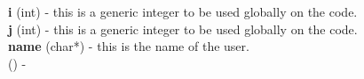 
{\bf i} (int) - this is a generic integer to be used globally on the code. \\

{\bf j} (int) - this is a generic integer to be used globally on the code. \\

{\bf name} (char*) - this is the name of the user. \\

{\bf } () -  \\


